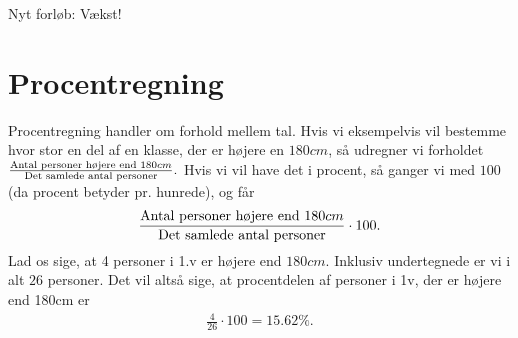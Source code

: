 
\begin{center}
\Huge
Nyt forløb: Vækst!
\end{center}

\section*{Procentregning}

Procentregning handler om forhold mellem tal. Hvis vi eksempelvis vil bestemme hvor stor en del af en klasse, der er højere en $180cm$, så udregner vi forholdet $\frac{\textnormal{Antal personer højere end }180cm}{\textnormal{Det samlede antal personer}}.$ Hvis vi vil have det i procent, så ganger vi med $100$ (da procent betyder pr. hunrede), og får
\begin{align*}
\frac{\textnormal{Antal personer højere end }180cm}{\textnormal{Det samlede antal personer}}\cdot 100.
\end{align*}
Lad os sige, at 4 personer i 1.v er højere end $180cm$. Inklusiv undertegnede er vi i alt $26$ personer. Det vil altså sige, at procentdelen af personer i 1v, der er højere end 180cm er 
\begin{align*}
\frac{4}{26}\cdot 100 = 15.62\%.
\end{align*}
